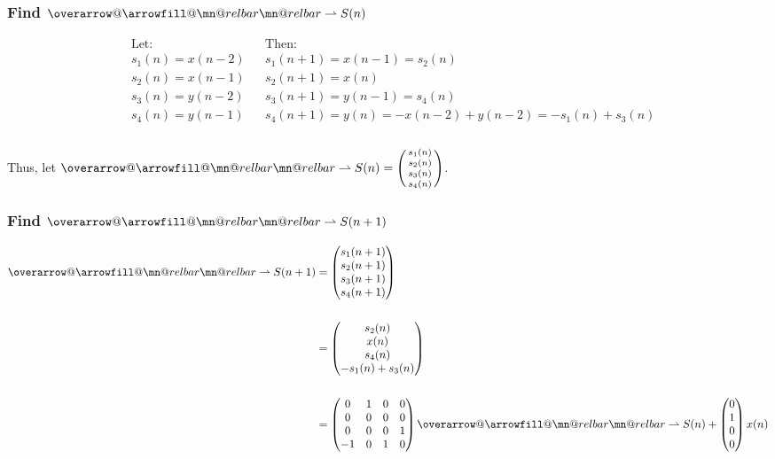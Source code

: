 \documentclass{article}
\makeatletter
\newenvironment{directsubsubs}{
  \makeatletter
  \renewcommand\thesubsubsection{\thesection.\Roman{subsubsection}}
  \makeatother
}{
  \makeatletter
  \renewcommand\thesubsubsection{\thesubsection.\Roman{subsubsection}}
  \makeatother
}
\renewcommand{\thesubsection}{\thesection.\alph{subsection}}
\renewcommand{\thesubsubsection}{\thesection.\alph{subsection}.\Roman{subsubsection}}
\DeclareRobustCommand{\overrightharpoon}{\mathpalette{\overarrow@\rightharpoonfill@}}
\def\rightharpoonfill@{\arrowfill@\mn@relbar\mn@relbar\rightharpoonup}
\makeatother
\begin{document}
\begin{directsubsubs}

\subsubsection[~\thesubsubsection]{Find $\overrightharpoon{S(n)}$}

\begin{align*}
	&\text{Let:}& &\text{Then:} \\
	&s_1(n) = x(n - 2)& &s_1(n + 1) = x(n - 1) = s_2(n) \\
	&s_2(n) = x(n - 1)& &s_2(n + 1) = x(n) \\
	&s_3(n) = y(n - 2)& &s_3(n + 1) = y(n - 1) = s_4(n) \\
	&s_4(n) = y(n - 1)& &s_4(n + 1) = y(n) = -x(n - 2) + y(n - 2) = -s_1(n) + s_3(n) \\\\
\end{align*}

Thus, let $\overrightharpoon{S(n)} = \begin{psmallmatrix} s_1(n) \\ s_2(n) \\ s_3(n) \\ s_4(n) \end{psmallmatrix}$.

\subsubsection[~\thesubsubsection]{Find $\overrightharpoon{S(n + 1)}$}

\begin{align*}
	\overrightharpoon{S(n + 1)} &= \begin{pmatrix} s_1(n + 1) \\ s_2(n + 1) \\ s_3(n + 1) \\ s_4(n + 1) \end{pmatrix} \\\\
	&= \begin{pmatrix} s_2(n) \\ x(n) \\ s_4(n) \\ -s_1(n) + s_3(n) \end{pmatrix} \\\\
	&= \begin{pmatrix} 0 & 1 & 0 & 0 \\ 0 & 0 & 0 & 0 \\ 0 & 0 & 0 & 1 \\ -1 & 0 & 1 & 0 \end{pmatrix}\overrightharpoon{S(n)} + \begin{pmatrix} 0 \\ 1 \\ 0 \\ 0 \end{pmatrix}x(n) \\\\
\end{align*}


\end{directsubsubs}
\end{document}
